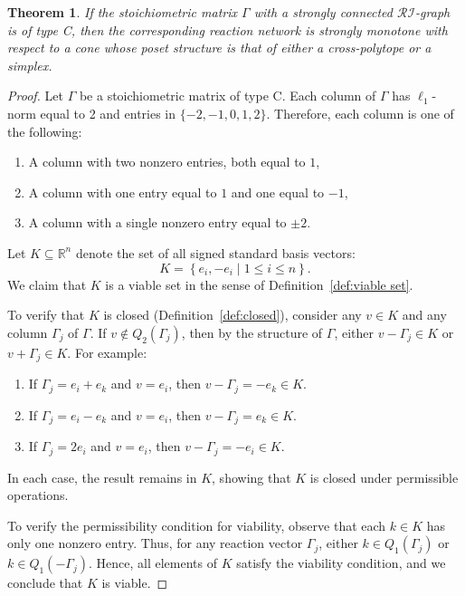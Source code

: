 \documentclass{article}
\newtheorem{thm}{Theorem}
\begin{document}
\begin{thm}
\label{thm:type C strongly monotone}
If the stoichiometric matrix \( \Gamma \) with a strongly connected $\mathcal{RI}$-graph is of type C, then the corresponding reaction network is strongly monotone with respect to a cone whose poset structure is that of either a cross-polytope or a simplex.
\end{thm}

\begin{proof}
Let \( \Gamma \) be a stoichiometric matrix of type C. Each column of \( \Gamma \) has \( \ell_1 \)-norm equal to 2 and entries in \( \{-2, -1, 0, 1, 2\} \). Therefore, each column is one of the following:
\begin{enumerate}
    \item A column with two nonzero entries, both equal to \( 1 \),
    \item A column with one entry equal to \( 1 \) and one equal to \( -1 \),
    \item A column with a single nonzero entry equal to \( \pm 2 \).
\end{enumerate}

Let \( K \subseteq \mathbb{R}^n \) denote the set of all signed standard basis vectors:
\[
K = \left\{ e_i, -e_i \mid 1 \leq i \leq n \right\}.
\]
We claim that \( K \) is a viable set in the sense of Definition~\ref{def:viable set}.

To verify that \( K \) is closed (Definition~\ref{def:closed}), consider any \( v \in K \) and any column \( \Gamma_j \) of \( \Gamma \). If \( v \notin Q_2(\Gamma_j) \), then by the structure of \( \Gamma \), either \( v - \Gamma_j \in K \) or \( v + \Gamma_j \in K \). For example:
\begin{enumerate}
    \item If \( \Gamma_j = e_i + e_k \) and \( v = e_i \), then \( v - \Gamma_j = -e_k \in K \).
    \item If \( \Gamma_j = e_i - e_k \) and \( v = e_i \), then \( v - \Gamma_j = e_k \in K \).
    \item If \( \Gamma_j = 2e_i \) and \( v = e_i \), then \( v - \Gamma_j = -e_i \in K \).
\end{enumerate}
In each case, the result remains in \( K \), showing that \( K \) is closed under permissible operations.

To verify the permissibility condition for viability, observe that each \( k \in K \) has only one nonzero entry. Thus, for any reaction vector \( \Gamma_j \), either \( k \in Q_1(\Gamma_j) \) or \( k \in Q_1(-\Gamma_j) \). Hence, all elements of \( K \) satisfy the viability condition, and we conclude that \( K \) is viable.


\end{proof}
\end{document}
